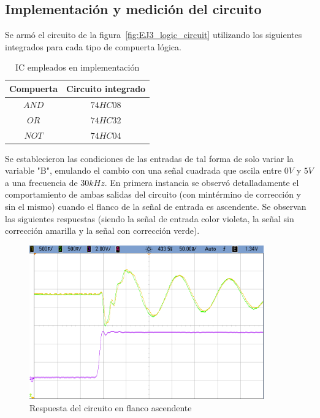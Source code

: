 \subsection{Implementaci\'on y medici\'on del circuito}

Se arm\'o el circuito de la figura~\ref{fig:EJ3_logic_circuit} utilizando los siguientes integrados para cada tipo de compuerta l\'ogica.

\begin{table}[H]
    \centering
    \begin{tabular}{c c}
        Compuerta & Circuito integrado\\
        \hline
        $AND$ & $74HC08$ \\
        $OR$ & $74HC32$\\
        $NOT$ & $74HC04$\\
        \hline
    \end{tabular}
    \caption{IC empleados en implementaci\'on}
\end{table}

Se establecieron las condiciones de las entradas de tal forma de solo variar la variable \textsc{"B"}, emulando el cambio con una se\~nal cuadrada que oscila entre $0V$ y $5V$ a una frecuencia de $30kHz$. En primera instancia se observ\'o detalladamente el comportamiento de ambas salidas del circuito (con mint\'ermino de correcci\'on y sin el mismo) cuando el flanco de la se\~nal de entrada es ascendente. Se observan las siguientes respuestas (siendo la se\~nal de entrada color violeta, la se\~nal sin correcci\'on amarilla y la se\~nal con correcci\'on verde).

\begin{figure}[H]
    \centering
    \includegraphics[width=0.9\textwidth]{../EJ3/Recursos/cropped_EJ3_positive_slope_response.png}
	\caption{Respuesta del circuito en flanco ascendente}
   	\label{fig:EJ3_positive_slope_response}
\end{figure}

